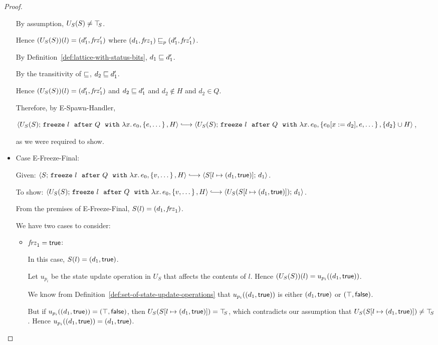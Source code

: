 \begin{proof}
\begin{itemize}
      By assumption, $U_S(S) \neq \top\hspace{-0.85mm}_{S}$.

      Hence $(U_S(S))(l) = (d'_1, \mathit{frz}'_1)$ where
      $(d_1, \mathit{frz}_1) \sqsubseteq_p (d'_1, \mathit{frz}'_1)$.

      By Definition~\ref{def:lattice-with-status-bits}, $d_1 \sqsubseteq
      d'_1$.

      By the transitivity of $\sqsubseteq$, $d_2 \sqsubseteq d'_1$.

      Hence $(U_S(S))(l) = (d'_1, \mathit{frz}'_1)$ and $d_2 \sqsubseteq
      d'_1$ and $d_2 \notin H$ and $d_2 \in Q$.

      Therefore, by {\sc E-Spawn-Handler},

      $\config{U_S(S)}{\freezeafterfull{l}{Q}{\lam{x}{e_0}}{\setof{e,
            \dots}}{H}} \parstepsto
      \config{U_S(S)}{\freezeafterfull{l}{Q}{\lam{x}{e_0}}{\setof{\subst{e_0}{x}{d_2},
            e, \dots}} {\{d_2\}\cup H}}$,

      as we were required to show.

    \item Case {\sc E-Freeze-Final}:

      Given:
      $\config{S}{\freezeafterfull{l}{Q}{\lam{x}{e_0}}{\setof{v,
            \dots}}{H}} \parstepsto
      \config{\extS{S}{l}{d_1}{\frozentrue}}{d_1}$.

      To show:
      $\config{U_S(S)}{\freezeafterfull{l}{Q}{\lam{x}{e_0}}{\setof{v,
            \dots}}{H}} \parstepsto
      \config{U_S(\extS{S}{l}{d_1}{\frozentrue})}{d_1}$.

      From the premises of {\sc E-Freeze-Final}, $S(l) =
      (d_1, \mathit{frz}_1)$.

      We have two cases to consider:
      \begin{itemize}
        \item $\mathit{frz}_1 = \textsf{true}$:

          In this case, $S(l) = (d_1, \textsf{true})$.

          Let $u_{p_i}$ be the state update operation in $U_S$ that
          affects the contents of $l$.  Hence $(U_S(S))(l) =
          u_{p_i}((d_1, \textsf{true}))$.

          We know from
          Definition~\ref{def:set-of-state-update-operations} that
          $u_{p_i}((d_1, \textsf{true}))$ is either
          $(d_1, \textsf{true})$ or $(\top, \textsf{false})$.

          But if $u_{p_i}((d_1, \textsf{true})) =
          (\top, \textsf{false})$, then
          $U_S(S[l \mapsto (d_1, \textsf{true})]) = \top\hspace{-0.85mm}_{S}$, which
          contradicts our assumption that
          $U_S(S[l \mapsto (d_1, \textsf{true})]) \neq \top\hspace{-0.85mm}_{S}$.  Hence
          $u_{p_i}((d_1, \textsf{true})) =
          (d_1, \textsf{true})$.


\end{itemize}
\end{itemize}
\end{proof}
